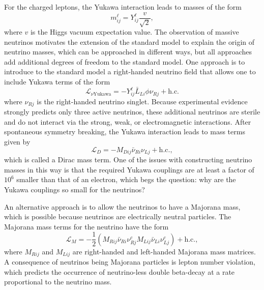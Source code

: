 For the charged leptons, the Yukawa interaction leads to masses of the form 
\begin{equation}
    m^\ell_{ij}=Y^\ell_{ij}\frac{v}{\sqrt{2}},
\end{equation}
where $v$ is the Higgs vacuum expectation value. The observation of massive neutrinos motivates the extension of the standard model to explain the origin of neutrino masses, which can be approached in different ways, but all approaches add additional degrees of freedom to the standard model. One approach is to introduce to the standard model a right-handed neutrino field that allows one to include Yukawa terms of the form 
\begin{equation}
    \mathcal{L}_{\nu\textrm{Yukawa}} = -Y^\ell_{ij}\bar{L}_{Li}\phi \nu_{Rj}+\textrm{h.c.}
\end{equation}
where $\nu_{Rj}$ is the right-handed neutrino singlet. Because experimental evidence strongly predicts only three active neutrinos, these additional neutrinos are sterile and do not interact via the strong, weak, or electromagnetic interactions. After spontaneous symmetry breaking, the Yukawa interaction leads to mass terms given by 
\begin{equation}
    \mathcal{L}_{D}=-M_{Dij}\bar{\nu}_{Ri}\nu_{Lj} +\textrm{h.c.},
\end{equation}
which is called a Dirac mass term. One of the issues with constructing neutrino masses in this way is that the required Yukawa couplings are at least a factor of $10^6$ smaller than that of an electron, which begs the question: why are the Yukawa couplings so small for the neutrinos?

An alternative approach is to allow the neutrinos to have a Majorana mass, which is possible because neutrinos are electrically neutral particles. The Majorana mass terms for the neutrino have the form 
\begin{equation}
    \mathcal{L}_{M}=-\frac{1}{2}(M_{Rij}\bar{\nu}_{Ri}\nu_{Rj}^c M_{Lij}\bar{\nu}_{Li}\nu_{Lj}^c) +\textrm{h.c.},
\end{equation}
where $M_{Rij}$ and $M_{Lij}$ are right-handed and left-handed Majorana mass matrices. A consequence of neutrinos being Majorana particles is lepton number violation, which predicts the occurrence of neutrino-less double beta-decay at a rate proportional to the neutrino mass.

